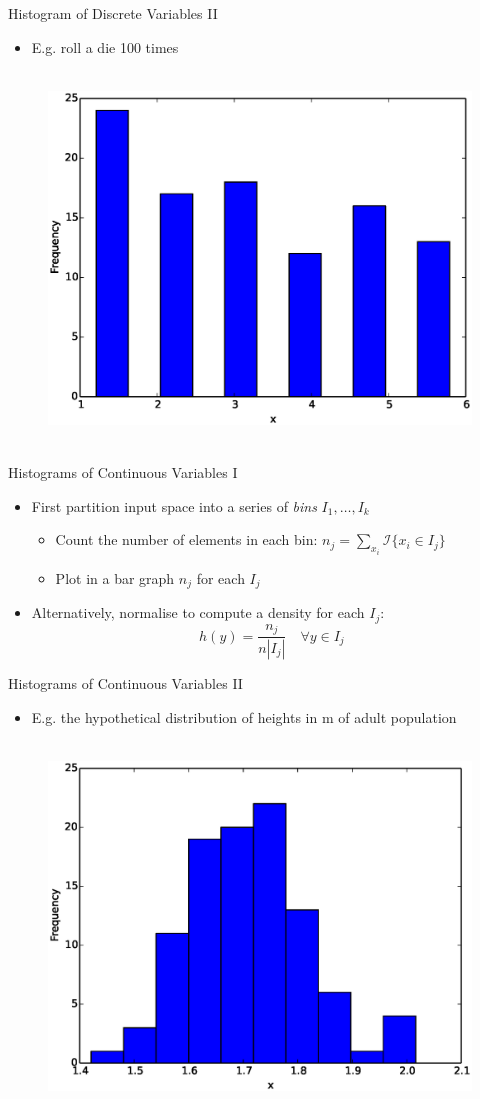 \documentclass{beamer}
\begin{document}
\begin{frame}{Histogram of Discrete Variables II}
\begin{itemize}
 \item E.g. roll a die 100 times 
\end{itemize}
\begin{figure}[htp]
\mbox{
\includegraphics[width=0.5\linewidth]{DiscreteHist.eps}
}
\end{figure}
\end{frame}

\begin{frame}{Histograms of Continuous Variables I}  
 \begin{itemize} 
  \item First partition input space into a series of \emph{bins} $ I_1, \ldots, I_k$ 
  \begin{itemize} 
  \item Count the number of elements in each bin: $n_j = \sum_{x_i} \mathcal{I}\{x_i \in I_j\}$
  \item Plot in a bar graph $n_j$ for each $I_j$
  \end{itemize} 
  \item Alternatively, normalise to compute a density for each $I_j$: 
  \begin{displaymath} 
    h(y) = \frac{n_j}{n |I_j|} \quad \forall y \in I_j
  \end{displaymath}
 \end{itemize}
\end{frame}

\begin{frame}{Histograms of Continuous Variables II} 
\begin{itemize}
 \item E.g. the hypothetical distribution of heights in m of adult population  
\end{itemize}
\begin{figure}[htp]
\mbox{
\includegraphics[width=0.5\linewidth]{ContinuousHist.eps}
}
\end{figure} 
\end{frame}
\end{document}
